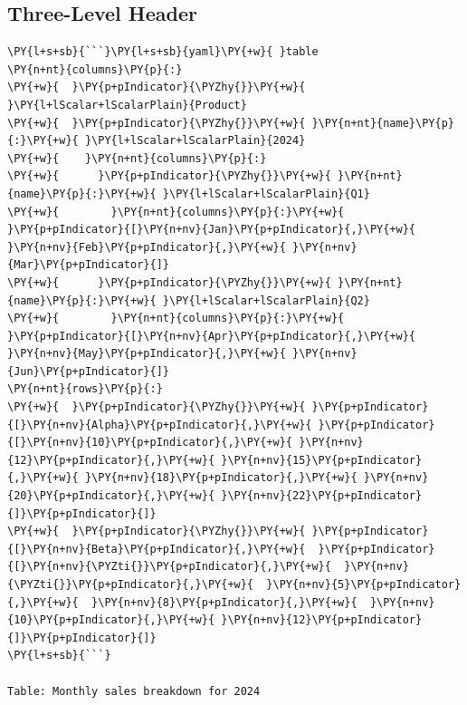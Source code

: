 \documentclass[a4paper,twoside]{article}
\begin{document}
\subsection{Three-Level Header}
\begin{tscode}[lang=markdown, engine=pygments]
\begin{Verbatim}[commandchars=\\\{\},breaklines, breakanywhere, commandchars=\\\{\}]
\PY{l+s+sb}{```}\PY{l+s+sb}{yaml}\PY{+w}{ }table
\PY{n+nt}{columns}\PY{p}{:}
\PY{+w}{  }\PY{p+pIndicator}{\PYZhy{}}\PY{+w}{ }\PY{l+lScalar+lScalarPlain}{Product}
\PY{+w}{  }\PY{p+pIndicator}{\PYZhy{}}\PY{+w}{ }\PY{n+nt}{name}\PY{p}{:}\PY{+w}{ }\PY{l+lScalar+lScalarPlain}{2024}
\PY{+w}{    }\PY{n+nt}{columns}\PY{p}{:}
\PY{+w}{      }\PY{p+pIndicator}{\PYZhy{}}\PY{+w}{ }\PY{n+nt}{name}\PY{p}{:}\PY{+w}{ }\PY{l+lScalar+lScalarPlain}{Q1}
\PY{+w}{        }\PY{n+nt}{columns}\PY{p}{:}\PY{+w}{ }\PY{p+pIndicator}{[}\PY{n+nv}{Jan}\PY{p+pIndicator}{,}\PY{+w}{ }\PY{n+nv}{Feb}\PY{p+pIndicator}{,}\PY{+w}{ }\PY{n+nv}{Mar}\PY{p+pIndicator}{]}
\PY{+w}{      }\PY{p+pIndicator}{\PYZhy{}}\PY{+w}{ }\PY{n+nt}{name}\PY{p}{:}\PY{+w}{ }\PY{l+lScalar+lScalarPlain}{Q2}
\PY{+w}{        }\PY{n+nt}{columns}\PY{p}{:}\PY{+w}{ }\PY{p+pIndicator}{[}\PY{n+nv}{Apr}\PY{p+pIndicator}{,}\PY{+w}{ }\PY{n+nv}{May}\PY{p+pIndicator}{,}\PY{+w}{ }\PY{n+nv}{Jun}\PY{p+pIndicator}{]}
\PY{n+nt}{rows}\PY{p}{:}
\PY{+w}{  }\PY{p+pIndicator}{\PYZhy{}}\PY{+w}{ }\PY{p+pIndicator}{[}\PY{n+nv}{Alpha}\PY{p+pIndicator}{,}\PY{+w}{ }\PY{p+pIndicator}{[}\PY{n+nv}{10}\PY{p+pIndicator}{,}\PY{+w}{ }\PY{n+nv}{12}\PY{p+pIndicator}{,}\PY{+w}{ }\PY{n+nv}{15}\PY{p+pIndicator}{,}\PY{+w}{ }\PY{n+nv}{18}\PY{p+pIndicator}{,}\PY{+w}{ }\PY{n+nv}{20}\PY{p+pIndicator}{,}\PY{+w}{ }\PY{n+nv}{22}\PY{p+pIndicator}{]}\PY{p+pIndicator}{]}
\PY{+w}{  }\PY{p+pIndicator}{\PYZhy{}}\PY{+w}{ }\PY{p+pIndicator}{[}\PY{n+nv}{Beta}\PY{p+pIndicator}{,}\PY{+w}{  }\PY{p+pIndicator}{[}\PY{n+nv}{\PYZti{}}\PY{p+pIndicator}{,}\PY{+w}{  }\PY{n+nv}{\PYZti{}}\PY{p+pIndicator}{,}\PY{+w}{  }\PY{n+nv}{5}\PY{p+pIndicator}{,}\PY{+w}{  }\PY{n+nv}{8}\PY{p+pIndicator}{,}\PY{+w}{  }\PY{n+nv}{10}\PY{p+pIndicator}{,}\PY{+w}{ }\PY{n+nv}{12}\PY{p+pIndicator}{]}\PY{p+pIndicator}{]}
\PY{l+s+sb}{```}

Table: Monthly sales breakdown for 2024
\end{Verbatim}
\end{tscode}
\end{document}
